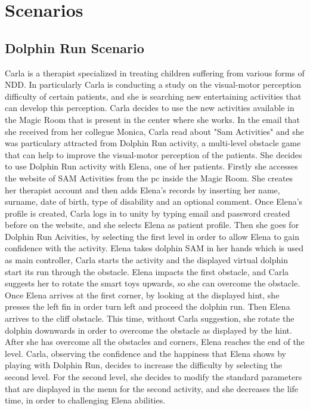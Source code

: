 \section{Scenarios}
\subsection{Dolphin Run Scenario}
Carla is a therapist specialized in treating children suffering from various forms of NDD. In particularly Carla is conducting a study on the visual-motor perception difficulty of certain patients, and she is searching new entertaining activities that can develop this perception. \newline
Carla decides to use the new activities available in the Magic Room that is present in the center where she works. In the email that she received from her collegue Monica, Carla read about "Sam Activities" and she was particulary attracted from Dolphin Run activity, a multi-level obstacle game that can help to improve the visual-motor perception of the patients. She decides to use Dolphin Run activity with Elena, one of her patients.
Firstly she accesses the website of SAM Activities from the pc inside the Magic Room. She creates her therapist account and then adds Elena's records by inserting her name, surname, date of birth, type of disability and an optional comment.
Once Elena's profile is created, Carla logs in to unity by typing email and password created before on the website, and she selects Elena as patient profile. Then she goes for Dolphin Run Acivities, by selecting the first level in order to allow Elena to gain confidence with the activity.
Elena takes dolphin SAM in her hands which is used as main controller, Carla starts the activity and the displayed virtual dolphin start its run through the obstacle. Elena impacts the first obstacle, and Carla suggests her to rotate the smart toys upwards, so she can overcome the obstacle. Once Elena arrives at the first corner, by looking at the displayed hint, she presses the left fin in order turn left and proceed the dolphin run. Then Elena arrives to the cliff obstacle. This time, without Carla suggestion, she rotate the dolphin downwards in order to overcome the obstacle as displayed by the hint. After she has overcome all the obstacles and corners, Elena reaches the end of the level.
\newline
Carla, observing the confidence and the happiness that Elena shows by playing with Dolphin Run, decides to increase the difficulty by selecting the second level. For the second level, she decides to modify the standard parameters that are displayed in the menu for the second activity, and she decreases the life time, in order to challenging Elena abilities. \newline
